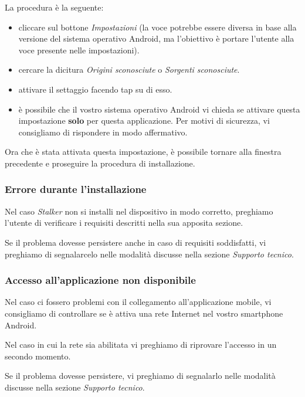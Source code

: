 \documentclass[../manuale-utente.tex]{subfiles}
\begin{document}
La procedura è la seguente:
\begin{itemize}
    \item cliccare sul bottone \textit{Impostazioni} (la voce potrebbe essere diversa in base alla versione del sistema operativo Android, ma l'obiettivo è portare l'utente alla voce presente nelle impostazioni).
    \item cercare la dicitura \textit{Origini sconosciute} o \textit{Sorgenti sconosciute}.
    \item attivare il settaggio facendo tap su di esso.
    \item è possibile che il vostro sistema operativo Android vi chieda se attivare questa impostazione \textbf{solo} per questa applicazione. Per motivi di sicurezza, vi consigliamo di rispondere in modo affermativo.
\end{itemize}

Ora che è stata attivata questa impostazione, è possibile tornare alla finestra precedente e proseguire la procedura di installazione.

\subsubsection{Errore durante l'installazione}%
\label{subs:mobile_app_errore_installazione}

Nel caso \textit{Stalker} non si installi nel dispositivo in modo corretto, preghiamo l'utente di verificare i requisiti descritti nella sua apposita sezione.

Se il problema dovesse persistere anche in caso di requisiti soddisfatti, vi preghiamo di segnalarcelo nelle modalità discusse nella sezione \textit{Supporto tecnico}.

\subsubsection{Accesso all'applicazione non disponibile}%
\label{subs:mobile_app_accesso_non_disponibile}

Nel caso ci fossero problemi con il collegamento all'applicazione mobile, vi consigliamo di controllare se è attiva una rete Internet nel vostro smartphone Android.

Nel caso in cui la rete sia abilitata vi preghiamo di riprovare l’accesso in un secondo momento.

Se il problema dovesse persistere, vi preghiamo di segnalarlo nelle modalità discusse nella sezione \textit{Supporto tecnico}.
\end{document}
